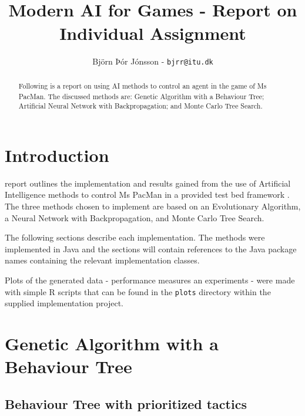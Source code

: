 \documentclass[conference]{IEEEtran}
\begin{document}
\title{\ \\ \LARGE\bf Modern AI for Games - Report on Individual Assignment}

\author{Björn Þór Jónsson - \texttt{bjrr@itu.dk}}


\maketitle

\begin{abstract}
Following is a report on using AI methods to\textbf{} control an agent in the game of Ms PacMan.  The discussed methods are:  Genetic Algorithm with a Behaviour Tree; Artificial Neural Network with Backpropagation; and Monte Carlo Tree Search.
\end{abstract}

\section{Introduction}
 report outlines the implementation and results gained from the use of Artificial Intelligence methods to control Ms PacMan in a provided test bed framework \cite{msPacManFramework}.  The three methods chosen to implement are based on an Evolutionary Algorithm, a Neural Network with Backpropagation, and Monte Carlo Tree Search.

The following sections describe each implementation.  The methods were implemented in Java and the sections will contain references to the Java package names containing the relevant implementation classes.

Plots of the generated data - performance measures an experiments - were made with simple R scripts that can be found in the \texttt{plots} directory within the supplied implementation project.


\section{Genetic Algorithm with a Behaviour Tree}

\subsection{Behaviour Tree with prioritized tactics}
\end{document}
